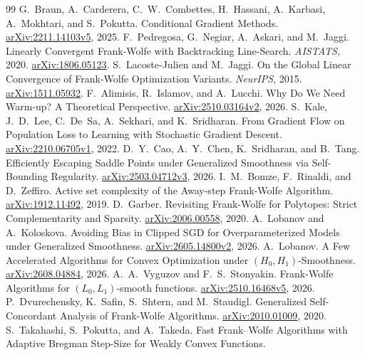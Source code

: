 ﻿\begin{thebibliography}{99}
 G.~Braun, A.~Carderera, C.~W.~Combettes, H.~Hassani,
A.~Karbasi, A.~Mokhtari, and S.~Pokutta. Conditional Gradient Methods.
\href{https://arxiv.org/abs/2211.14103v5}{arXiv:2211.14103v5}, 2025.
 F.~Pedregosa, G.~Negiar, A.~Askari, and M.~Jaggi.
Linearly Convergent Frank-Wolfe with Backtracking Line-Search.
\emph{AISTATS}, 2020. \href{https://arxiv.org/abs/1806.05123}{arXiv:1806.05123}.
 S.~Lacoste-Julien and M.~Jaggi.
On the Global Linear Convergence of Frank-Wolfe Optimization Variants.
\emph{NeurIPS}, 2015.
\href{https://arxiv.org/abs/1511.05932}{arXiv:1511.05932}.
 F.~Alimisis, R.~Islamov, and A.~Lucchi.
Why Do We Need Warm-up? A Theoretical Perspective.
\href{https://arxiv.org/abs/2510.03164v2}{arXiv:2510.03164v2}, 2026.
 S.~Kale, J.~D.~Lee, C.~De~Sa, A.~Sekhari, and K.~Sridharan.
From Gradient Flow on Population Loss to Learning with Stochastic Gradient Descent.
\href{https://arxiv.org/abs/2210.06705v1}{arXiv:2210.06705v1}, 2022.
 D.~Y.~Cao, A.~Y.~Chen, K.~Sridharan, and B.~Tang.
Efficiently Escaping Saddle Points under Generalized Smoothness via Self-Bounding Regularity.
\href{https://arxiv.org/abs/2503.04712v3}{arXiv:2503.04712v3}, 2026.
 I.~M.~Bomze, F.~Rinaldi, and D.~Zeffiro.
Active set complexity of the Away-step Frank-Wolfe Algorithm.
\href{https://arxiv.org/abs/1912.11492}{arXiv:1912.11492}, 2019.
 D.~Garber.
Revisiting Frank-Wolfe for Polytopes: Strict Complementarity and Sparsity.
\href{https://arxiv.org/abs/2006.00558}{arXiv:2006.00558}, 2020.
 A.~Lobanov and A.~Koloskova.
Avoiding Bias in Clipped SGD for Overparameterized Models under Generalized Smoothness.
\href{https://arxiv.org/abs/2605.14800v2}{arXiv:2605.14800v2}, 2026.
 A.~Lobanov.
A Few Accelerated Algorithms for Convex Optimization under $(H_0,H_1)$-Smoothness.
\href{https://arxiv.org/abs/2608.04884}{arXiv:2608.04884}, 2026.
 A.~A.~Vyguzov and F.~S.~Stonyakin.
Frank-Wolfe Algorithms for $(L_0,L_1)$-smooth functions.
\href{https://arxiv.org/abs/2510.16468v5}{arXiv:2510.16468v5}, 2026.
 P.~Dvurechensky, K.~Safin, S.~Shtern, and M.~Staudigl.
Generalized Self-Concordant Analysis of Frank-Wolfe Algorithms.
\href{https://arxiv.org/abs/2010.01009}{arXiv:2010.01009}, 2020.
 S.~Takahashi, S.~Pokutta, and A.~Takeda.
Fast Frank--Wolfe Algorithms with Adaptive Bregman Step-Size for Weakly Convex Functions.

\end{thebibliography}
